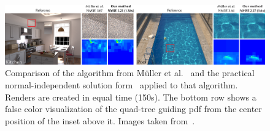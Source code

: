\begin{figure}[h]
    \centering
    \includegraphics[width=\textwidth]{images/pg_scenes.png}
    \caption{Comparison of the algorithm from M\"uller et al.~\cite{mueller2017} and the practical normal-independent solution form~\cite{Karlik2019} applied to that algorithm.
    Renders are created in equal time (150s).
    The bottom row shows a false color visualization of the quad-tree guiding pdf from the center position of the inset above it.
    Images taken from~\cite[Figure~10]{Karlik2019}.}
    \label{fig:path_scenes}
\end{figure}